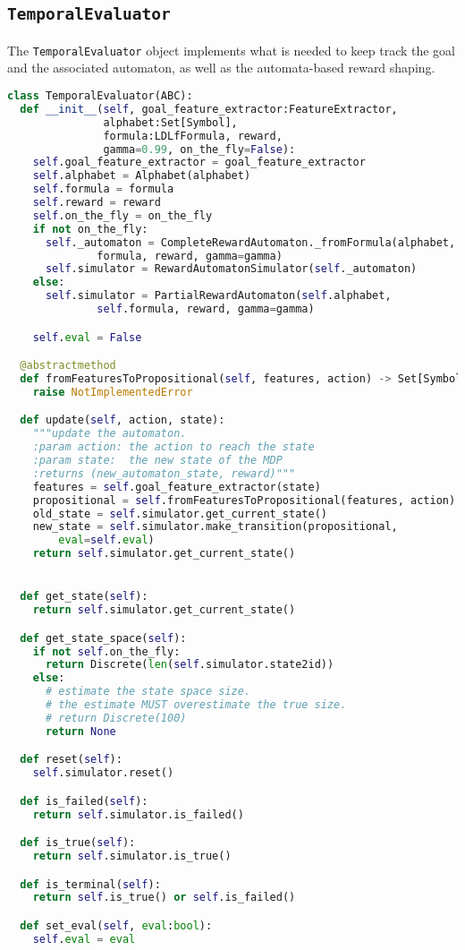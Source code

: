 \subsection{\texttt{TemporalEvaluator}}
The \texttt{TemporalEvaluator} object implements what is needed to keep track the \LLf goal and the associated automaton, as well as the automata-based reward shaping.
\begin{lstlisting}[style=Python, language=Python, escapechar=£, label={code:temporalEvaluator}, caption={\texttt{TemporalEvaluator}}]
class TemporalEvaluator(ABC):
  def __init__(self, goal_feature_extractor:FeatureExtractor, 
               alphabet:Set[Symbol], 
               formula:LDLfFormula, reward,
               gamma=0.99, on_the_fly=False):
    self.goal_feature_extractor = goal_feature_extractor
    self.alphabet = Alphabet(alphabet)
    self.formula = formula
    self.reward = reward
    self.on_the_fly = on_the_fly
    if not on_the_fly:
      self._automaton = CompleteRewardAutomaton._fromFormula(alphabet,
              formula, reward, gamma=gamma)
      self.simulator = RewardAutomatonSimulator(self._automaton)
    else:
      self.simulator = PartialRewardAutomaton(self.alphabet,
              self.formula, reward, gamma=gamma)

    self.eval = False

  @abstractmethod
  def fromFeaturesToPropositional(self, features, action) -> Set[Symbol]:
    raise NotImplementedError

  def update(self, action, state):
    """update the automaton.
    :param action: the action to reach the state
    :param state:  the new state of the MDP
    :returns (new_automaton_state, reward)"""
    features = self.goal_feature_extractor(state)
    propositional = self.fromFeaturesToPropositional(features, action)
    old_state = self.simulator.get_current_state()
    new_state = self.simulator.make_transition(propositional, 
        eval=self.eval)
    return self.simulator.get_current_state()


  def get_state(self):
    return self.simulator.get_current_state()

  def get_state_space(self):
    if not self.on_the_fly:
      return Discrete(len(self.simulator.state2id))
    else:
      # estimate the state space size.
      # the estimate MUST overestimate the true size.
      # return Discrete(100)
      return None

  def reset(self):
    self.simulator.reset()

  def is_failed(self):
    return self.simulator.is_failed()

  def is_true(self):
    return self.simulator.is_true()

  def is_terminal(self):
    return self.is_true() or self.is_failed()

  def set_eval(self, eval:bool):
    self.eval = eval
\end{lstlisting}
